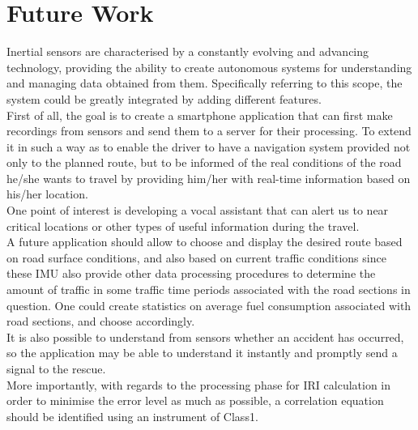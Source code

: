 \documentclass[tesi]{subfiles}
\begin{document}
\section{Future Work}
Inertial sensors are characterised by a constantly evolving and advancing technology, providing the ability to create autonomous systems for understanding and managing data obtained from them. Specifically referring to this scope, the system could be greatly integrated by adding different features.\\
First of all, the goal is to create a smartphone application that can first make recordings from sensors and send them to a server for their processing. To extend it in such a way as to enable the driver to have a navigation system provided not only to the planned route, but to be informed of the real conditions of the road he/she wants to travel by providing him/her with real-time information based on his/her location.\\
One point of interest is developing a vocal assistant that can alert us to near critical locations or other types of useful information during the travel.\\
A future application should allow to choose and display the desired route based on road surface conditions, and also based on current traffic conditions since these IMU also provide other data processing procedures to determine the amount of traffic in some traffic time periods associated with the road sections in question. One could create statistics on average fuel consumption associated with road sections, and choose accordingly.\\
It is also possible to understand from sensors whether an accident has occurred, so the application may be able to understand it instantly and promptly send a signal to the rescue.\\
More importantly, with regards to the processing phase for IRI calculation in order to minimise the error level as much as possible, a correlation equation should be identified using an instrument of Class1.
\end{document}
